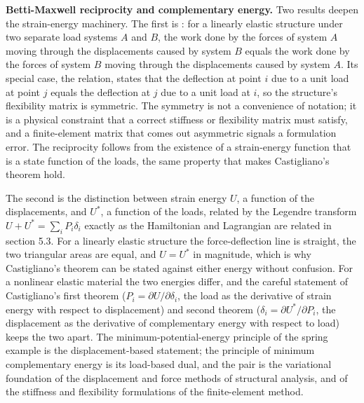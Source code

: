 \begin{mastery}
\textbf{Betti-Maxwell reciprocity and complementary energy.} Two
results deepen the strain-energy machinery. The first is : for a linearly elastic structure under two separate
load systems $A$ and $B$, the work done by the forces of system $A$
moving through the displacements caused by system $B$ equals the work done
by the forces of system $B$ moving through the displacements caused by
system $A$. Its special case, the  relation,
states that the deflection at point $i$ due to a unit load at point $j$
equals the deflection at $j$ due to a unit load at $i$, so the structure's
flexibility matrix is symmetric. The symmetry is not a convenience of
notation; it is a physical constraint that a correct stiffness or
flexibility matrix must satisfy, and a finite-element matrix that comes
out asymmetric signals a formulation error. The reciprocity follows from
the existence of a strain-energy function that is a state function of the
loads, the same property that makes Castigliano's theorem hold.

The second is the distinction between strain energy $U$, a function of
the displacements, and  $U^*$, a function
of the loads, related by the Legendre transform $U + U^* = \sum_i P_i
\delta_i$ exactly as the Hamiltonian and Lagrangian are related in
section 5.3. For a linearly elastic structure the force-deflection line
is straight, the two triangular areas are equal, and $U = U^*$ in
magnitude, which is why Castigliano's theorem can be stated against either
energy without confusion. For a nonlinear elastic material the two
energies differ, and the careful statement of Castigliano's first theorem
($P_i = \partial U/\partial\delta_i$, the load as the derivative of strain
energy with respect to displacement) and second theorem ($\delta_i =
\partial U^*/\partial P_i$, the displacement as the derivative of
complementary energy with respect to load) keeps the two apart. The
minimum-potential-energy principle of the spring example is the
displacement-based statement; the principle of minimum complementary
energy is its load-based dual, and the pair is the variational foundation
of the displacement and force methods of structural analysis, and of the
stiffness and flexibility formulations of the finite-element method.
\end{mastery}

